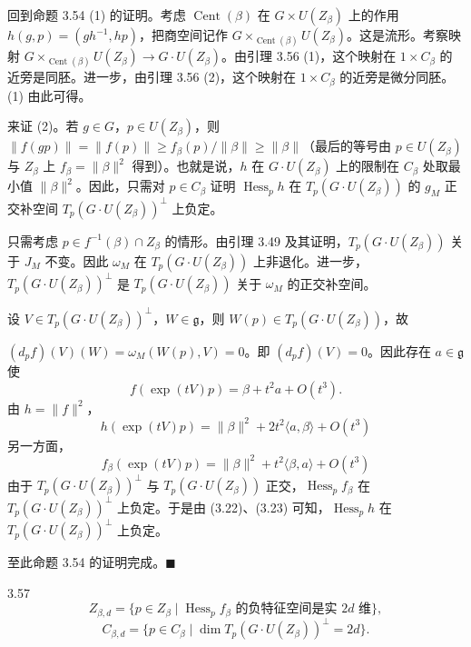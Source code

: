 回到命题 3.54 (1) 的证明。考虑 $\operatorname{Cent}(\beta)$ 在 $G\times U(Z_\beta)$ 上的作用 $h(g,p)=(gh^{-1},hp)$，把商空间记作 $G\times_{\operatorname{Cent}(\beta)}U(Z_\beta)$。这是流形。考察映射 $G\times_{\operatorname{Cent}(\beta)}U(Z_\beta)\to G\cdot U(Z_\beta)$。由引理 3.56 (1)，这个映射在 $1\times C_\beta$ 的近旁是同胚。进一步，由引理 3.56 (2)，这个映射在 $1\times C_\beta$ 的近旁是微分同胚。(1) 由此可得。

来证 (2)。若 $g\in G$，$p\in U(Z_\beta)$，则 $\|f(gp)\|=\|f(p)\|\ge f_\beta(p)/\|\beta\|\ge\|\beta\|$（最后的等号由 $p\in U(Z_\beta)$ 与 $Z_\beta$ 上 $f_\beta=\|\beta\|^2$ 得到）。也就是说，$h$ 在 $G\cdot U(Z_\beta)$ 上的限制在 $C_\beta$ 处取最小值 $\|\beta\|^2$。因此，只需对 $p\in C_\beta$ 证明 $\operatorname{Hess}_ph$ 在 $T_p(G\cdot U(Z_\beta))$ 的 $g_M$ 正交补空间 $T_p(G\cdot U(Z_\beta))^{\perp}$ 上负定。

只需考虑 $p\in f^{-1}(\beta)\cap Z_\beta$ 的情形。由引理 3.49 及其证明，$T_p(G\cdot U(Z_\beta))$ 关于 $J_M$ 不变。因此 $\omega_M$ 在 $T_p(G\cdot U(Z_\beta))$ 上非退化。进一步，$T_p(G\cdot U(Z_\beta))^{\perp}$ 是 $T_p(G\cdot U(Z_\beta))$ 关于 $\omega_M$ 的正交补空间。

设 $V\in T_p(G\cdot U(Z_\beta))^{\perp}$，$W\in\mathfrak{g}$，则 $W(p)\in T_p(G\cdot U(Z_\beta))$，故

$(d_pf)(V)(W)=\omega_M(W(p),V)=0$。即 $(d_pf)(V)=0$。因此存在 $a\in\mathfrak{g}$ 使
\[
  f(\exp(tV)p)=\beta+t^2a+O(t^3).
\]
由 $h=\|f\|^2$，
\begin{equation}
  h(\exp(tV)p)=\|\beta\|^2+2t^2\langle a,\beta\rangle+O(t^3) \tag{3.22}
\end{equation}
另一方面，
\begin{equation}
  f_\beta(\exp(tV)p)=\|\beta\|^2+t^2\langle\beta,a\rangle+O(t^3) \tag{3.23}
\end{equation}
由于 $T_p(G\cdot U(Z_\beta))^{\perp}$ 与 $T_p(G\cdot U(Z_\beta))$ 正交，$\operatorname{Hess}_pf_\beta$ 在 $T_p(G\cdot U(Z_\beta))^{\perp}$ 上负定。于是由 (3.22)、(3.23) 可知，$\operatorname{Hess}_ph$ 在 $T_p(G\cdot U(Z_\beta))^{\perp}$ 上负定。

至此命题 3.54 的证明完成。\hfill$\blacksquare$

\begin{definition}{3.57}
  \[
    Z_{\beta,d}=\{p\in Z_\beta\mid \operatorname{Hess}_pf_\beta \text{ 的负特征空间是实 }2d\text{ 维}\},
  \]
  \[
    C_{\beta,d}=\{p\in C_\beta\mid \dim T_p(G\cdot U(Z_\beta))^{\perp}=2d\}.
  \]
\end{definition}

